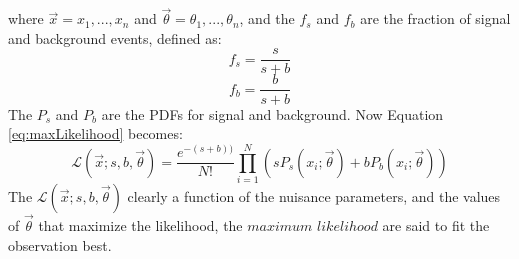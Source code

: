 where $\vec{x}=x_{1}, ..., x_{n}$ and $\vec{\theta}=\theta_{1}, ..., \theta_{n}$, and the $f_{s}$ and $f_{b}$ are the fraction of signal and background events, defined as:
\begin{equation}
f_{s}=\frac{s}{s+b}
\end{equation}        
\begin{equation}
f_{b}=\frac{b}{s+b}
\end{equation}        
The $P_{s}$ and $P_{b}$ are the PDFs for signal and background. 
Now Equation \ref{eq:maxLikelihood} becomes:
\begin{equation}
\mathcal{L}(\vec{x}; s, b, \vec{\theta})=\frac{e^{-(s+b))}}{N!}\prod_{i=1}^{N}\left( sP_{s}(x_{i}; \vec{\theta})+bP_{b}(x_{i};\vec{\theta})\right)
\end{equation}
The $\mathcal{L}(\vec{x}; s, b, \vec{\theta})$ clearly a function of the nuisance parameters, and the values of $\vec{\theta}$ that maximize the likelihood, the $maximum$ $likelihood$ are said to fit the observation best.
